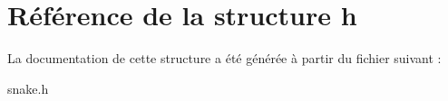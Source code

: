 \hypertarget{structsnake_1_1h}{\section{Référence de la structure h}
\label{structsnake_1_1h}
}


La documentation de cette structure a été générée à partir du fichier suivant \-:\begin{DoxyCompactItemize}
\item 
snake.\-h\end{DoxyCompactItemize}
